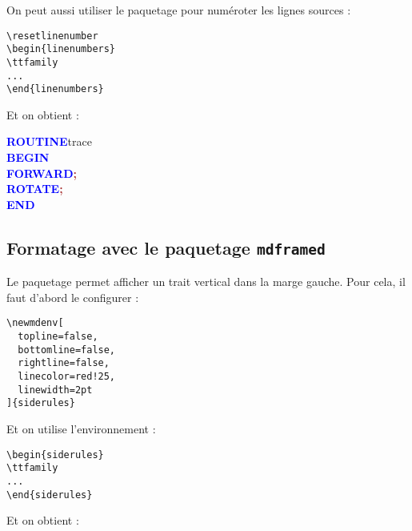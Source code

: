 On peut aussi utiliser le paquetage  pour numéroter les lignes sources :
\begin{verbatim}
\resetlinenumber
\begin{linenumbers}
\ttfamily
...
\end{linenumbers}
\end{verbatim}

Et on obtient :

\resetlinenumber
\begin{linenumbers}\singlespacing\ttfamily
\textcolor{blue}{\bf ROUTINE}\hspace*{.6em}t{}r{}a{}c{}e{} \\
\textcolor{blue}{\bf BEGIN} \\
\hspace*{1.2em}\textcolor{blue}{\bf FORWARD}\hspace*{.6em}\textcolor{brown}{\bf ;} \\
\hspace*{1.2em}\textcolor{blue}{\bf ROTATE}\hspace*{.6em}\textcolor{brown}{\bf ;} \\
\textcolor{blue}{\bf END}
\end{linenumbers}

\subsection{Formatage avec le paquetage \texttt{mdframed}}

Le paquetage  permet afficher un trait vertical dans la marge gauche. Pour cela, il faut d'abord le configurer :

\begin{verbatim}
\newmdenv[
  topline=false,
  bottomline=false,
  rightline=false,
  linecolor=red!25,
  linewidth=2pt
]{siderules}
\end{verbatim}

Et on utilise l'environnement  :

\begin{verbatim}
\begin{siderules}
\ttfamily
...
\end{siderules}
\end{verbatim}

Et on obtient :

